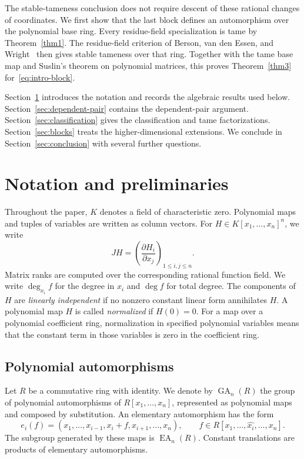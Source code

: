 \documentclass[11pt,reqno]{amsart}
\theoremstyle{definition}
\theoremstyle{remark}
\numberwithin{equation}{section}
\DeclareMathOperator{\GA}{GA}
\DeclareMathOperator{\EA}{EA}
\begin{document}
The stable-tameness conclusion does not require descent of these rational changes of coordinates. We first show that the last block defines an automorphism over the polynomial base ring. Every residue-field specialization is tame by Theorem~\ref{thm1}. The residue-field criterion of Berson, van den Essen, and Wright~\cite[Theorem~4.12]{BEW} then gives stable tameness over that ring. Together with the tame base map and Suslin's theorem on polynomial matrices, this proves Theorem~\ref{thm3} for~\eqref{eq:intro-block}.

Section~\ref{sec:preliminaries} introduces the notation and records the algebraic results used below. Section~\ref{sec:dependent-pair} contains the dependent-pair argument. Section~\ref{sec:classification} gives the classification and tame factorizations. Section~\ref{sec:blocks} treats the higher-dimensional extensions. We conclude in Section~\ref{sec:conclusion} with several further questions.

\section{Notation and preliminaries}\label{sec:preliminaries}

Throughout the paper, $K$ denotes a field of characteristic zero. Polynomial maps and tuples of variables are written as column vectors. For $H\in K[x_1,\ldots,x_n]^n$, we write
\[
 JH=\left(\frac{\partial H_i}{\partial x_j}\right)_{1\leq i,j\leq n}.
\]
Matrix ranks are computed over the corresponding rational function field. We write $\deg_{x_i}f$ for the degree in $x_i$ and $\deg f$ for total degree. The components of $H$ are \emph{linearly independent} if no nonzero constant linear form annihilates $H$. A polynomial map $H$ is called \emph{normalized} if $H(0)=0$. For a map over a polynomial coefficient ring, normalization in specified polynomial variables means that the constant term in those variables is zero in the coefficient ring.

\subsection{Polynomial automorphisms}
Let $R$ be a commutative ring with identity. We denote by $\GA_n(R)$ the group of polynomial automorphisms of $R[x_1,\ldots,x_n]$, represented as polynomial maps and composed by substitution. An elementary automorphism has the form
\[
 e_i(f)=(x_1,\ldots,x_{i-1},x_i+f,x_{i+1},\ldots,x_n),
 \qquad f\in R[x_1,\ldots,\widehat{x_i},\ldots,x_n].
\]
The subgroup generated by these maps is $\EA_n(R)$. Constant translations are products of elementary automorphisms.
\end{document}
